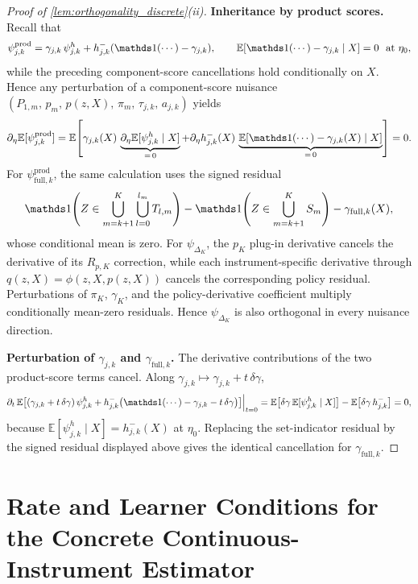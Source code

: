 \begin{proof}[Proof of \cref{lem:orthogonality_discrete}\textup{(ii)}]
\textbf{Inheritance by product scores.}
Recall that
\begin{equation*}
    \psi_{j,k}^{\mathrm{prod}} = \gamma_{j,k}\,\psi_{j,k}^h + h_{j,k}^-(\indicator(\cdots) - \gamma_{j,k}),
    \qquad \mathbb{E}[\indicator(\cdots) - \gamma_{j,k} \mid X] = 0 \ \text{ at } \eta_0,
\end{equation*}
while the preceding component-score cancellations hold conditionally on $X$. Hence any perturbation of a component-score nuisance
$(P_{1,m},\,p_m,\,p(z,X),\,\pi_m,\,\tau_{j,k},\,a_{j,k})$
yields
\[
    \partial_\eta \mathbb{E}[\psi_{j,k}^{\mathrm{prod}}]
    =\mathbb E\!\left[\gamma_{j,k}(X)\,\underbrace{\partial_\eta \mathbb{E}[\psi_{j,k}^h\mid X]}_{=\,0}
    +\partial_\eta h_{j,k}^-(X)\,\underbrace{\mathbb{E}[\indicator(\cdots) - \gamma_{j,k}(X) \mid X]}_{=\,0}\right]=0.
\]
For $\psi_{\mathrm{full},k}^{\mathrm{prod}}$, the same calculation uses the signed residual
\[
\indicator\!\left(Z\in\bigcup_{m=k+1}^K\bigcup_{l=0}^{l_m}T_{l,m}\right)
-\indicator\!\left(Z\in\bigcup_{m=k+1}^KS_m\right)-\gamma_{\mathrm{full},k}(X),
\]
whose conditional mean is zero. For $\psi_{\Delta_K}$, the $p_K$ plug-in derivative cancels the derivative of its $R_{p,K}$ correction, while each instrument-specific derivative through $q(z,X)=\phi(z,X,p(z,X))$ cancels the corresponding policy residual. Perturbations of $\pi_K$, $\gamma_K$, and the policy-derivative coefficient multiply conditionally mean-zero residuals. Hence $\psi_{\Delta_K}$ is also orthogonal in every nuisance direction.

\textbf{Perturbation of $\gamma_{j,k}$ and $\gamma_{\mathrm{full},k}$.}
The derivative contributions of the two product-score terms cancel. Along $\gamma_{j,k} \mapsto \gamma_{j,k} + t\,\delta\gamma$,
\[
    \partial_t\,\mathbb{E}\bigl[(\gamma_{j,k}+t\,\delta\gamma)\,\psi_{j,k}^h + h_{j,k}^-\bigl(\indicator(\cdots) - \gamma_{j,k} - t\,\delta\gamma\bigr)\bigr]\Big|_{t=0}
    = \mathbb{E}\bigl[\delta\gamma\,\mathbb{E}[\psi_{j,k}^h \mid X]\bigr] - \mathbb{E}\bigl[\delta\gamma\,h_{j,k}^-\bigr] = 0,
\]
because $\mathbb{E}[\psi_{j,k}^h \mid X] = h_{j,k}^-(X)$ at $\eta_0$. Replacing the set-indicator residual by the signed residual displayed above gives the identical cancellation for $\gamma_{\mathrm{full},k}$.

\end{proof}

\section{Rate and Learner Conditions for the Concrete Continuous-Instrument Estimator}\label{app:continuous_learner_conditions}

